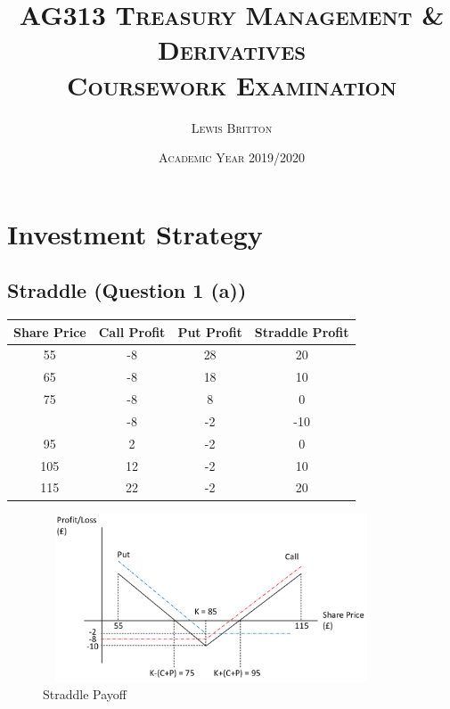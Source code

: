 \documentclass[11pt, english]{article}
\begin{document}

        \title{\textsc{AG313 Treasury Management \& Derivatives\\ Coursework Examination}}
        \author{\textsc{Lewis Britton}}
        \date{\textsc{Academic Year 2019/2020}}
        \maketitle

\newpage


        \renewcommand{\contentsname}{Table of Contents}

        \tableofcontents 

\newpage


\section{Investment Strategy}

	\subsection{Straddle (Question 1 (a))}

	\begin{table}[h]
		\scriptsize
		\renewcommand{\arraystretch}{1.25}
	\begin{center}
	\begin{tabular}{cccc}
		\hline
		\textbf{Share Price} & \textbf{Call Profit} & \textbf{Put Profit} & \textbf{Straddle Profit}\\
		\hline
		55 & -8 & 28 & 20\\
		65 & -8 & 18 & 10\\
		75 & -8 & 8 & 0\\
		\fbox{85} & -8 & -2 & -10\\
		95 & 2 & -2 & 0\\
		105 & 12 & -2 & 10\\
		115 & 22 & -2 & 20\\
		\hline
	\end{tabular}
	\end{center}
	\end{table}

	\begin{figure}[H]
	\begin{center}
		\includegraphics[height=5cm,width=10cm]{AG313-IMG/a.png}
	\end{center}
		\caption{Straddle Payoff}
	\end{figure}
\end{document}
